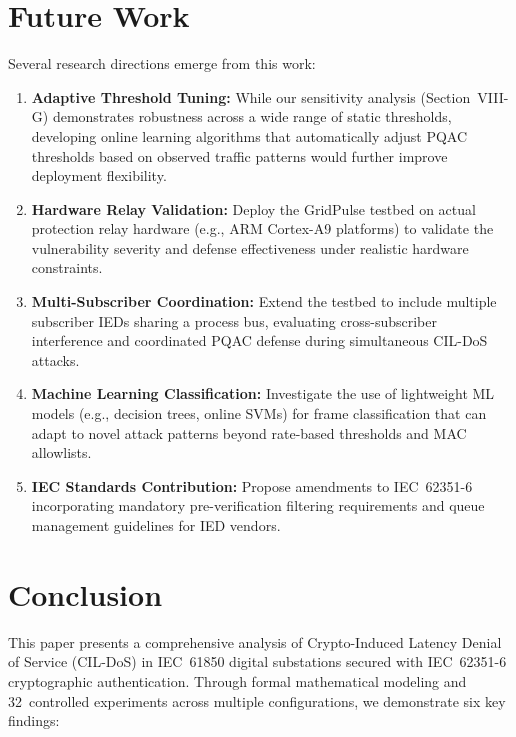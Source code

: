 \documentclass[journal]{IEEEtran}
\begin{document}
\section{Future Work}

Several research directions emerge from this work:

\begin{enumerate}[leftmargin=*]
    \item \textbf{Adaptive Threshold Tuning:} While our sensitivity analysis (Section~VIII-G) demonstrates robustness across a wide range of static thresholds, developing online learning algorithms that automatically adjust PQAC thresholds based on observed traffic patterns would further improve deployment flexibility.
    \item \textbf{Hardware Relay Validation:} Deploy the GridPulse testbed on actual protection relay hardware (e.g., ARM Cortex-A9 platforms) to validate the vulnerability severity and defense effectiveness under realistic hardware constraints.
    \item \textbf{Multi-Subscriber Coordination:} Extend the testbed to include multiple subscriber IEDs sharing a process bus, evaluating cross-subscriber interference and coordinated PQAC defense during simultaneous CIL-DoS attacks.
    \item \textbf{Machine Learning Classification:} Investigate the use of lightweight ML models (e.g., decision trees, online SVMs) for frame classification that can adapt to novel attack patterns beyond rate-based thresholds and MAC allowlists.
    \item \textbf{IEC Standards Contribution:} Propose amendments to IEC~62351-6 incorporating mandatory pre-verification filtering requirements and queue management guidelines for IED vendors.
\end{enumerate}

\section{Conclusion}

This paper presents a comprehensive analysis of Crypto-Induced Latency Denial of Service (CIL-DoS) in IEC~61850 digital substations secured with IEC~62351-6 cryptographic authentication. Through formal mathematical modeling and 32~controlled experiments across multiple configurations, we demonstrate six key findings:
\end{document}
